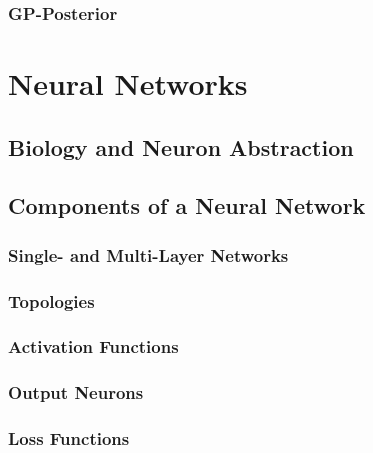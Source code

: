 			\subsubsection{GP-Posterior} %

	\section{Neural Networks} %

		\subsection{Biology and Neuron Abstraction} %

		\subsection{Components of a Neural Network} %

			\subsubsection{Single- and Multi-Layer Networks} %

			\subsubsection{Topologies} %

			\subsubsection{Activation Functions} %

			\subsubsection{Output Neurons} %

			\subsubsection{Loss Functions} %

